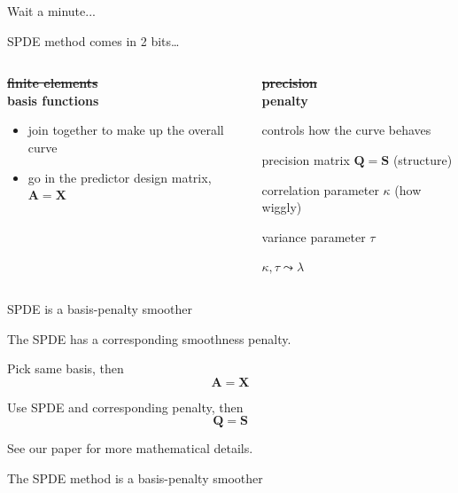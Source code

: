 \documentclass{beamer}
\begin{document}
\begin{frame}

{\Huge Wait a minute...}
\end{frame}

\begin{frame}{SPDE method comes in 2 bits\ldots}
  \begin{columns}[T]
    \begin{column}{0.40\textwidth}
      {\color{gray} \textbf{\sout{finite elements}}}\\
      \textbf{basis functions}
      \begin{itemize}
        \item join together to make up the overall curve
        \item go in the {\color{gray} predictor} design matrix, $\textbf{A} = \bm{X}$ 
      \end{itemize}
    \end{column}
    \begin{column}{0.58\textwidth}
      {\color{gray} \sout{\textbf{precision}}}\\
      \textbf{penalty}
      \begin{itemize}
        \item controls how the curve behaves
        \item precision matrix $\textbf{Q} = \bm{S}$ (structure)
        \item {\color{gray} correlation parameter $\kappa$ (how wiggly)
        \item variance parameter $\tau$ } 
        \item $\kappa, \tau \leadsto \lambda$ 
      \end{itemize}
    \end{column}
  \end{columns}
\end{frame}

\begin{frame}{SPDE is a basis-penalty smoother}

{\Large
The SPDE has a corresponding smoothness penalty.

Pick same basis, then 
$$ \bm{A} = \bm{X}  $$

Use SPDE and corresponding penalty, then 
$$ \bm{Q} = \bm{S} $$
}

\small{See our paper for more mathematical details.}
\end{frame}

\begin{frame}{The SPDE method is a basis-penalty smoother}

\end{frame}
\end{document}
